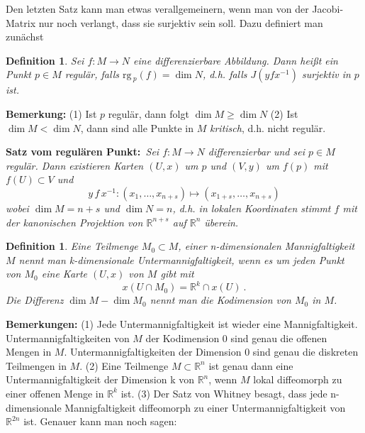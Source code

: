 \documentclass[12pt,a4paper]{article}
\def\R{\mathbb{R}}
\def\rg{\mathrm{rg}\,}
\newtheorem{Definition}[Lemma]{Definition}
\begin{document}
\medskip

Den letzten Satz kann man etwas verallgemeinern, wenn man von der Jacobi-Matrix nur noch verlangt, dass sie
surjektiv sein soll. Dazu definiert man zun\"achst

\begin{Definition}
Sei $f:M\rightarrow N$ eine differenzierbare Abbildung. Dann hei\ss t ein Punkt $p \in M$ {\em regul\"ar}, falls
$\rg_p(f) = \dim N$, d.h. falls $J(yfx^{-1})$ surjektiv in $p$ ist.
\end{Definition}

{\bf Bemerkung:}
(1) Ist $p$ regul\"ar, dann folgt $\dim M \ge \dim N$ (2) Ist $\dim M < \dim N$, dann sind alle Punkte in
$M$ {\it kritisch}, d.h. nicht regul\"ar.

\bigskip

{\bf Satz vom regul\"aren Punkt:}{\it \, Sei $f:M\rightarrow N$ differenzierbar und sei $p\in M$ regul\"ar. Dann
existieren Karten $(U,x)$ um $p$ und $(V,y)$ um $f(p)$ mit $f(U)\subset V$ und
$$
y\,f\,x^{-1}: (x_1,\ldots,x_{n+s}) \mapsto (x_{1+s},\ldots,x_{n+s})
$$
wobei $\dim M = n+s$ und $\dim N = n$, d.h. in lokalen Koordinaten stimmt $f$  mit der kanonischen
Projektion von $\R^{n+s}$ auf $\R^n$ \"uberein.}

\bigskip

\begin{Definition}
Eine Teilmenge $M_0\subset M$, einer n-dimensionalen Mannigfaltigkeit $M$ nennt man k-dimensionale
{\em Untermannigfaltigkeit}, wenn es um jeden Punkt von $M_0$ eine Karte $(U,x)$ von $M$ gibt mit
$$
x(U \cap M_0) = \R^k \cap x(U) \ .
$$
Die Differenz $\dim M - \dim M_0$ nennt man die {\em Kodimension} von $M_0$ in $M$.
\end{Definition}

\medskip

{\bf Bemerkungen:} (1) Jede Untermannigfaltigkeit ist wieder eine Mannigfaltigkeit. Untermannigfaltigkeiten
von $M$ der Kodimension 0 sind genau die offenen Mengen in $M$. Untermannigfaltigkeiten der Dimension 0 sind
genau die diskreten Teilmengen in $M$. (2) Eine Teilmenge $M \subset \R^n$ ist genau dann eine Untermannigfaltigkeit
der Dimension k von $\R^n$, wenn $M$ lokal diffeomorph zu einer offenen Menge in $\R^k$ ist. (3) Der Satz von
Whitney besagt, dass jede n-dimensionale Mannigfaltigkeit diffeomorph zu einer Untermannigfaltigkeit von $\R^{2n}$
ist. Genauer kann man noch sagen:

\medskip
\end{document}
